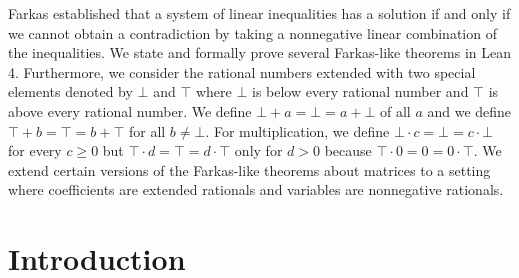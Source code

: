 \documentclass[]{article}
\begin{document}
\let\r=\rightarrow
\let\*=\cdot

\renewcommand{\arraystretch}{1.25}


Farkas established that a system of linear inequalities has a solution if and only if we cannot obtain
a contradiction by taking a nonnegative linear combination of the inequalities.
We state and formally prove several Farkas-like theorems in Lean 4.
Furthermore, we consider the rational numbers extended with two special elements denoted by $\bot$ and $\top$
where $\bot$ is below every rational number and $\top$ is above every rational number.
We define $\bot + a = \bot = a + \bot$ of all $a$ and we define $\top + b = \top = b + \top$ for all $b \neq \bot$.
For multiplication, we define $\bot \cdot c = \bot = c \cdot \bot$ for every $c \ge 0$ but
$\top \cdot d = \top = d \cdot \top$ only for $d > 0$ because $\top \cdot 0 = 0 = 0 \cdot \top$.
We extend certain versions of the Farkas-like theorems about matrices to a setting where
coefficients are extended rationals and variables are nonnegative rationals.


\section {Introduction}
\end{document}
